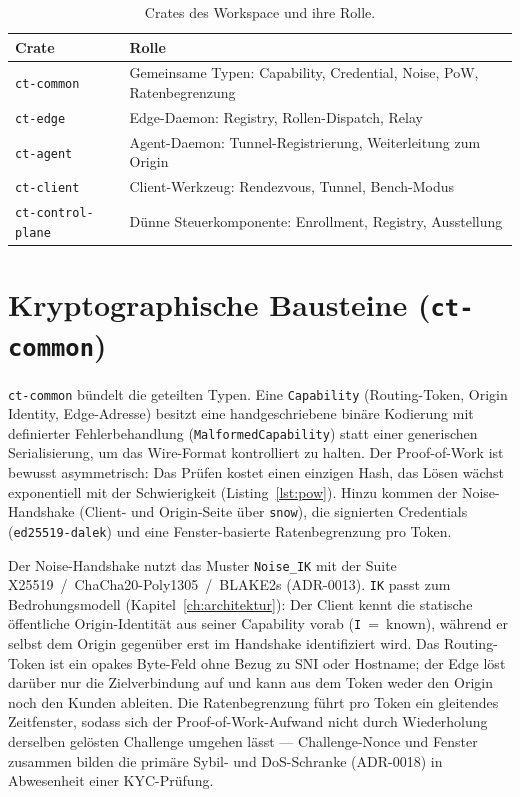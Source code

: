\begin{table}[t]
  \centering
  \caption{Crates des Workspace und ihre Rolle.}
  \label{tab:crates}
  \begin{tabular}{l p{8.6cm}}
    \toprule
    Crate & Rolle \\
    \midrule
    \texttt{ct-common} & Gemeinsame Typen: Capability, Credential, Noise, PoW, Ratenbegrenzung \\
    \texttt{ct-edge} & Edge-Daemon: Registry, Rollen-Dispatch, Relay \\
    \texttt{ct-agent} & Agent-Daemon: Tunnel-Registrierung, Weiterleitung zum Origin \\
    \texttt{ct-client} & Client-Werkzeug: Rendezvous, Tunnel, Bench-Modus \\
    \texttt{ct-control-plane} & Dünne Steuerkomponente: Enrollment, Registry, Ausstellung \\
    \bottomrule
  \end{tabular}
\end{table}

\section{Kryptographische Bausteine (\texttt{ct-common})}
\label{sec:bausteine}

\texttt{ct-common} bündelt die geteilten Typen. Eine \texttt{Capability}
(Routing-Token, Origin Identity, Edge-Adresse) besitzt eine handgeschriebene
binäre Kodierung mit definierter Fehlerbehandlung (\texttt{MalformedCapability})
statt einer generischen Serialisierung, um das Wire-Format kontrolliert zu
halten. Der Proof-of-Work ist bewusst asymmetrisch: Das Prüfen kostet einen
einzigen Hash, das Lösen wächst exponentiell mit der Schwierigkeit
(Listing~\ref{lst:pow}). Hinzu kommen der Noise-Handshake (Client- und
Origin-Seite über \texttt{snow}), die signierten Credentials
(\texttt{ed25519-dalek}) und eine Fenster-basierte Ratenbegrenzung pro Token.

Der Noise-Handshake nutzt das Muster \texttt{Noise\_IK} mit der Suite
X25519~/~ChaCha20-Poly1305~/~BLAKE2s (ADR-0013). \texttt{IK} passt zum
Bedrohungsmodell (Kapitel~\ref{ch:architektur}): Der Client kennt die statische
öffentliche Origin-Identität aus seiner Capability vorab (\texttt{I}~=~known),
während er selbst dem Origin gegenüber erst im Handshake identifiziert wird.
Das Routing-Token ist ein opakes Byte-Feld ohne Bezug zu SNI oder Hostname;
der Edge löst darüber nur die Zielverbindung auf und kann aus dem Token weder
den Origin noch den Kunden ableiten. Die Ratenbegrenzung führt pro Token ein
gleitendes Zeitfenster, sodass sich der Proof-of-Work-Aufwand nicht durch
Wiederholung derselben gelösten Challenge umgehen lässt --- Challenge-Nonce und
Fenster zusammen bilden die primäre Sybil- und DoS-Schranke (ADR-0018) in
Abwesenheit einer KYC-Prüfung.

